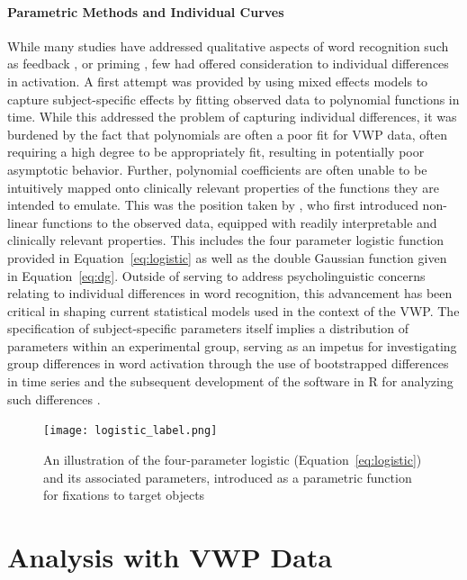 \paragraph{Parametric Methods and Individual Curves} While many studies have addressed qualitative aspects of word recognition such as feedback \citep{Magnuson2003}, or priming \citep{luce1998delayed}, few had offered consideration to individual differences in activation. A first attempt was provided by \citet{Mirman2008} using mixed effects models to capture subject-specific effects by fitting observed data to polynomial functions in time. While this addressed the problem of capturing individual differences, it was burdened by the fact that polynomials are often a poor fit for VWP data, often requiring a high degree to be appropriately fit, resulting in potentially poor asymptotic behavior. Further, polynomial coefficients are often unable to be intuitively mapped onto clinically relevant properties of the functions they are intended to emulate. This was the position taken by \citet{mcmurray2010individual}, who first introduced non-linear functions to the observed data, equipped with readily interpretable and clinically relevant properties. This includes the four parameter logistic function provided in Equation~\ref{eq:logistic} as well as the double Gaussian function given in Equation~\ref{eq:dg}. Outside of serving to address psycholinguistic concerns relating to individual differences in word recognition, this advancement has been critical in shaping current statistical models used in the context of the VWP. The specification of subject-specific parameters itself implies a distribution of parameters within an experimental group, serving as an impetus for investigating group differences in word activation through the use of bootstrapped differences in time series \citep{oleson2017detecting} and the subsequent development of the  software in R for analyzing such differences \citep{seedorff2018bdots}.



\begin{figure}[h]
\centering
\texttt{[image: logistic\_label.png]}
\caption{An illustration of the four-parameter logistic (Equation~\ref{eq:logistic}) and its associated parameters, introduced as a parametric function for fixations to target objects}
\label{fig:logistic_definition}
\end{figure}



\section{Analysis with VWP Data}

